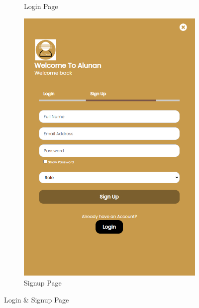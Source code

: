\begin{enumerate}[1.]
\begin{figure}[h]
\begin{subfigure}[b]{0.4\textwidth}
            \caption{Login Page}
            \label{fig:sub1}
        \end{subfigure}
        \hspace{0.05\textwidth}
        \begin{subfigure}[b]{0.4\textwidth}
            \centering
            \includegraphics[width=\textwidth]{mainmatter/images/frontend/ss/Login-Signup2.png}
            \caption{Signup Page}
            \label{fig:sub2}
        \end{subfigure}
        \caption{Login \& Signup Page}
        \label{fig:myfig49}
    \end{figure}
    \clearpage
    \begin{figure}[h]\ContinuedFloat
        \centering
        \begin{subfigure}[b]{0.7\textwidth}

\end{subfigure}
\end{figure}
\end{enumerate}
